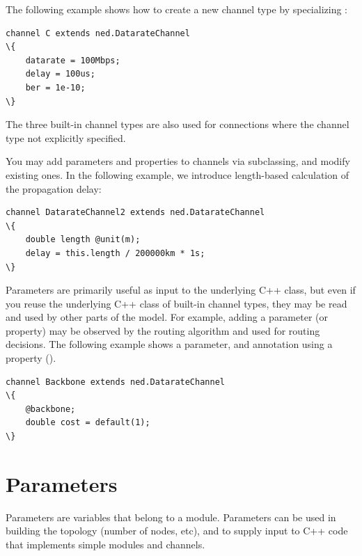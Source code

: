 The following example shows how to create a new channel type by
specializing :

\begin{Verbatim}[commandchars=\\\{\}]
channel C extends ned.DatarateChannel
\{
    datarate = 100Mbps;
    delay = 100us;
    ber = 1e-10;
\}
\end{Verbatim}

\begin{note}
    The three built-in channel types are also used for connections where
    the channel type not explicitly specified.
\end{note}

You may add parameters and properties to channels via subclassing, and
modify existing ones. In the following example, we introduce length-based
calculation of the propagation delay:

\begin{Verbatim}[commandchars=\\\{\}]
channel DatarateChannel2 extends ned.DatarateChannel
\{
    double length @unit(m);
    delay = this.length / 200000km * 1s;
\}
\end{Verbatim}

Parameters are primarily useful as input to the underlying C++ class, but
even if you reuse the underlying C++ class of built-in channel types, they
may be read and used by other parts of the model. For example, adding a
 parameter (or  property) may be observed by the
routing algorithm and used for routing decisions. The following example
shows a  parameter, and annotation using a property
().

\begin{Verbatim}[commandchars=\\\{\}]
channel Backbone extends ned.DatarateChannel
\{
    @backbone;
    double cost = default(1);
\}
\end{Verbatim}



\section{Parameters}
\label{sec:ch-ned-lang:parameters}

Parameters are variables that belong to a module. Parameters can be
used in building the topology (number of nodes, etc), and to supply
input to C++ code that implements simple modules and channels.

